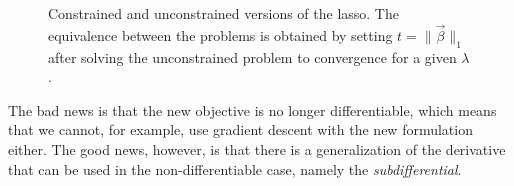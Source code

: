 \begin{figure}[htpb]
  \centering
  \hspace*{0.8cm}%
  \caption{%
    Constrained and unconstrained versions of the lasso. The equivalence between the problems is obtained by setting \(t = \lVert \vec{\beta}\rVert_1\) after solving the unconstrained problem to convergence for a given \(\lambda\).
  }
  \label{fig:constrained-unconstrained}
\end{figure}

The bad news is that the new objective is no longer differentiable, which means that we cannot, for example, use gradient descent with the new formulation either. The good news, however, is that there is a generalization of the derivative that can be used in the non-differentiable case, namely the \emph{subdifferential}.

